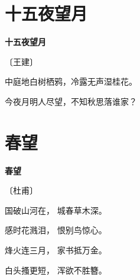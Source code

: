 \documentclass[12pt,UTF-8,openany,fontset=none]{ctexbook}
\begin{document}
\vspace{8pt}
\clearpage

\section{十五夜望月}


\begin{center}
    {\bfseries 十五夜望月}

    \vspace{18pt}

    \begin{large}\xuwen
        〔王建〕
    \end{large}

\end{center}

    \vspace{18pt}  %

\begin{center}
    \begin{Large}

        中庭地白树栖鸦，冷露无声湿桂花。

        今夜月明人尽望，不知秋思落谁家？

    \end{Large}

\end{center}

\vspace{8pt}
\clearpage

\section{春望}


\begin{center}
    {\bfseries 春望}

    \vspace{18pt}

    \begin{large}\xuwen
        〔杜甫〕
    \end{large}

\end{center}

    \vspace{18pt}  %

\begin{center}
    \begin{Large}

        国破山河在， 城春草木深。

        感时花溅泪， 恨别鸟惊心。

        烽火连三月， 家书抵万金。

        白头搔更短， 浑欲不胜簪。

    \end{Large}

\end{center}
\end{document}
